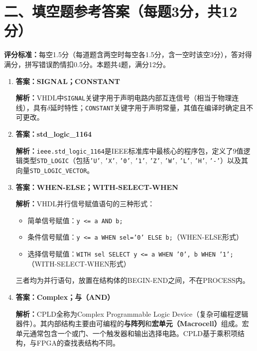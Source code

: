 \section*{二、填空题参考答案（每题3分，共12分）}

\begin{framed}
\textbf{评分标准：}每空1.5分（每道题含两空时每空各1.5分，含一空时该空3分），答对得满分，拼写错误酌情扣0.5分。本题共4题，满分12分。
\end{framed}

\begin{enumerate}[label=\arabic*.]

\item \textbf{答案：SIGNAL；CONSTANT}

\textbf{解析：}VHDL中\texttt{SIGNAL}关键字用于声明电路内部互连信号（相当于物理连线），具有$\delta$延时特性；\texttt{CONSTANT}关键字用于声明常量，其值在编译时确定且不可更改。

\item \textbf{答案：std\_logic\_1164}

\textbf{解析：}\texttt{ieee.std\_logic\_1164}是IEEE标准库中最核心的程序包，定义了9值逻辑类型\texttt{STD\_LOGIC}（包括\texttt{'U'}, \texttt{'X'}, \texttt{'0'}, \texttt{'1'}, \texttt{'Z'}, \texttt{'W'}, \texttt{'L'}, \texttt{'H'}, \texttt{'-'}）以及其向量\texttt{STD\_LOGIC\_VECTOR}。

\item \textbf{答案：WHEN-ELSE；WITH-SELECT-WHEN}

\textbf{解析：}VHDL并行信号赋值语句的三种形式：
\begin{itemize}
  \item 简单信号赋值：\texttt{y <= a AND b;}
  \item 条件信号赋值：\texttt{y <= a WHEN sel='0' ELSE b;}（WHEN-ELSE形式）
  \item 选择信号赋值：\texttt{WITH sel SELECT y <= a WHEN '0', b WHEN '1';}（WITH-SELECT-WHEN形式）
\end{itemize}
三者均为并行语句，放置在结构体的BEGIN-END之间，不在PROCESS内。

\item \textbf{答案：Complex；与（AND）}

\textbf{解析：}CPLD全称为Complex Programmable Logic Device（复杂可编程逻辑器件）。其内部结构主要由可编程的\textbf{与阵列}和\textbf{宏单元（Macrocell）}组成。宏单元通常包含一个或门、一个触发器和输出选择电路。CPLD基于乘积项结构，与FPGA的查找表结构不同。

\end{enumerate}

